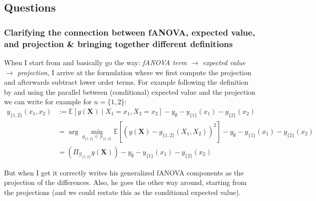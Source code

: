 
\subsection*{Questions}
\subsubsection*{Clarifying the connection between fANOVA, expected value, and projection \& bringing together different definitions}
When I start from \cite{muehlenstaedt2012} and basically go the way: \textit{fANOVA term $\rightarrow$ expected value $\rightarrow$ projection}, I arrive at the formulation where we first compute the projection and afterwards subtract lower order terms. For example following the definition by \cite{muehlenstaedt2012} and using the parallel between (conditional) expected value and the projection \citep{vanravenzwaaij2018} we can write for example for $u = \{1,2\}$:
\begin{align*}
    y_{\{1,2\}}(x_1, x_2)
    &:= \mathbb{E}[y(\boldsymbol{X}) \mid X_1 = x_1, X_2 = x_2] - y_\emptyset - y_{\{1\}}(x_1) - y_{\{2\}}(x_2) \\
    &= \arg\min_{g_{\{1,2\}} \in \mathcal{G}_{\{1,2\}}} \mathbb{E}\left[(y(\boldsymbol{X}) - g_{\{1,2\}}(X_1, X_2))^2\right] - y_\emptyset - y_{\{1\}}(x_1) - y_{\{2\}}(x_2) \\
    &= (\Pi_{\mathcal{G}_{\{1,2\}}}y(\boldsymbol{X})) - y_\emptyset - y_{\{1\}}(x_1) - y_{\{2\}}(x_2)
\end{align*}

But when I get it correctly \cite{hooker2007} writes his generalized fANOVA components as the projection of the differences. Also, he goes the other way around, starting from the projections (and we could restate this as the conditional expected value).

